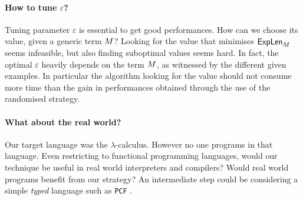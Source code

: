 \paragraph{How to tune $\varepsilon$?} Tuning parameter $\varepsilon$ is essential to get good performances. How can we choose its value, given a generic term $M$? Looking for the value that minimises $\textsf{ExpLen}_{M}$ seems infeasible, but also finding suboptimal values seems hard. In fact, the optimal $\varepsilon$ heavily depends on the term $M$, as witnessed by the different given examples. In particular the algorithm looking for the value should not consume more time than the gain in performances obtained through the use of the randomised strategy.
\paragraph{What about the real world?} Our target language was the $\lambda$-calculus. However no one programs in that language. Even restricting to functional programming languages, would our technique be useful in real world interpreters and compilers? Would real world programs benefit from our strategy? An intermediate step could be considering a simple \emph{typed} language such as \texttt{PCF} \cite{plotkin_lcf_1977}. 